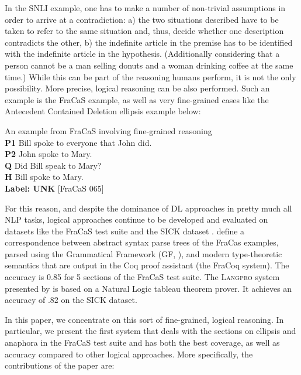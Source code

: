 \documentclass[11pt]{article}
\begin{document}
%
In the SNLI example, one has to make a number of non-trivial
assumptions in order to arrive at a contradiction: a) the two
situations described have to be taken to refer to the same situation
and, thus, decide whether one description contradicts the other, b)
the indefinite article in the premise has to be identified with the
indefinite article in the hypothesis. (Additionally considering that a
person cannot be a man selling donuts and a woman drinking coffee at
the same time.) While this can be part of the reasoning humans
perform, it is not the only possibility. More precise, logical
reasoning can be also performed. Such an example is the FraCaS
example, as well as very fine-grained cases like the Antecedent
Contained Deletion ellipsis example below:

\begin{lingex}

\item An example from FraCaS involving fine-grained reasoning\\
\textbf{P1}	Bill spoke to everyone that John did.	\\	
\textbf{P2}	John spoke to Mary.	\\
\textbf{Q} 	Did Bill speak to Mary?\\
\textbf{H} 	Bill spoke to Mary.\\
\textbf{Label:	UNK} [FraCaS 065] 	\end{lingex}




For this reason, and despite the dominance of DL approaches in pretty
much all NLP tasks, logical approaches continue to be
developed and evaluated on datasets like the FraCaS test suite and the
SICK dataset \cite{marelli:2014}.  \citet{bernardy:2017} define a
correspondence between abstract syntax parse trees of the FraCas
examples, parsed using the Grammatical Framework (GF,
\citet{Ranta:GF}), and modern type-theoretic semantics that are output
in the Coq proof assistant (the FraCoq system).  The accuracy is 0.85
for 5 sections of the FraCaS test suite. The \textsc{Langpro} system
presented by \citet{abzianidze:2015} is based on a Natural Logic
tableau theorem prover. It achieves an accuracy of .82 on the SICK
dataset.

In this paper, we concentrate on this sort of fine-grained, logical
reasoning. In particular, we present the first system that deals with
the sections on ellipsis and anaphora in the FraCaS test suite and has
both the best coverage, as well as accuracy compared to other logical
approaches. More specifically, the contributions of the paper are:
\end{document}
